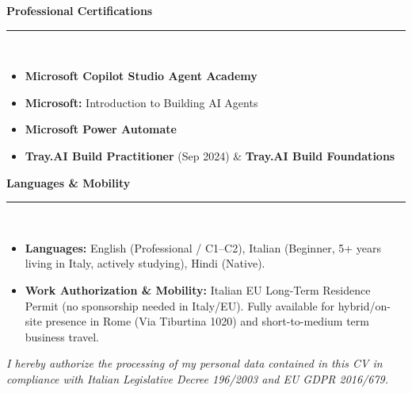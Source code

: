 \documentclass[10pt,a4paper]{article}
\newcommand{\cvsection}[1]{%
  \vspace{6pt}%
  {\large\bfseries\color{primary}#1}\\[-3pt]%
  {\color{linegray}\rule{\textwidth}{0.75pt}}\\[3pt]%
}
\begin{document}
\cvsection{Professional Certifications}
\begin{itemize}
  \item \textbf{Microsoft Copilot Studio Agent Academy}
  \item \textbf{Microsoft:} Introduction to Building AI Agents
  \item \textbf{Microsoft Power Automate}
  \item \textbf{Tray.AI Build Practitioner} (Sep 2024) \& \textbf{Tray.AI Build Foundations}
\end{itemize}

\cvsection{Languages \& Mobility}
\begin{itemize}
  \item \textbf{Languages:} English (Professional / C1--C2), Italian (Beginner, 5+ years living in Italy, actively studying), Hindi (Native).
  \item \textbf{Work Authorization \& Mobility:} Italian EU Long-Term Residence Permit (no sponsorship needed in Italy/EU). Fully available for hybrid/on-site presence in Rome (Via Tiburtina 1020) and short-to-medium term business travel.
\end{itemize}

\vspace{6pt}
\begin{center}
  \scriptsize\textit{\color{secondary} I hereby authorize the processing of my personal data contained in this CV in compliance with Italian Legislative Decree 196/2003 and EU GDPR 2016/679.}
\end{center}
\end{document}
